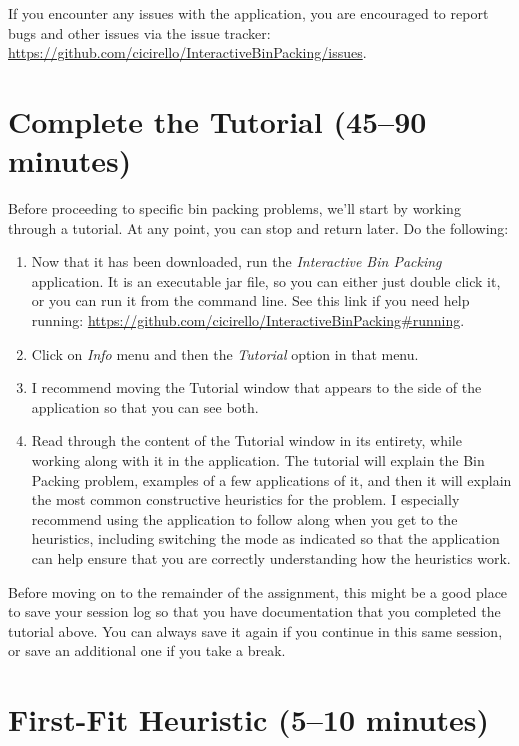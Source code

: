 \documentclass[11pt,letterpaper]{article}
\begin{document}
If you encounter any issues with the application, you are encouraged to
report bugs and other issues via the issue tracker: 
\url{https://github.com/cicirello/InteractiveBinPacking/issues}.


\section{Complete the Tutorial (45--90 minutes)}\label{sec:tutorial}
Before proceeding to specific bin packing problems, we'll start
by working through a tutorial. At any point, you can stop and return 
later. Do the following:
\begin{enumerate}[leftmargin=*, parsep=0pt, itemsep=2pt, topsep=2pt]
\item Now that it has been downloaded, run the {\em Interactive Bin Packing}
application. It is an executable jar file, so you can either just double click
it, or you can run it from the command line.  See this link if you need
help running: \url{https://github.com/cicirello/InteractiveBinPacking#running}.
\item Click on {\em Info} menu and then the {\em Tutorial} option in that menu.
\item I recommend moving the Tutorial window that appears to the 
side of the application so that you can see both.
\item Read through the content of the Tutorial window in its 
entirety, while working along with it in the application. The tutorial 
will explain the Bin Packing problem, examples of a few applications 
of it, and then it will explain the most common constructive heuristics 
for the problem. I especially recommend using the application to 
follow along when you get to the heuristics, including switching the mode
as indicated so that the application can help ensure that you are 
correctly understanding how the heuristics work.
\end{enumerate}

Before moving on to the remainder of the assignment, this might
be a good place to save your session log so that you have documentation
that you completed the tutorial above.  You can always save it again
if you continue in this same session, or save an additional one if
you take a break.


\newpage

\section{First-Fit Heuristic (5--10 minutes)}\label{sec:ff}
\end{document}
